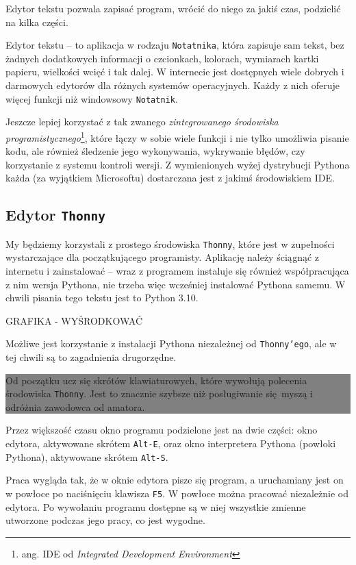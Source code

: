 \documentclass[a4paper]{article}
\newcommand{\important}[1]{
    \begin{center}\colorbox{gray}{
        \begin{minipage}[t]{0.9\textwidth}{#1}
        \end{minipage}
    }
    \end{center}
}
\begin{document}
Edytor tekstu pozwala zapisać program, wrócić do niego za jakiś czas, podzielić na kilka części.

Edytor tekstu -- to aplikacja w rodzaju \texttt{Notatnika}, która zapisuje sam tekst, bez żadnych dodatkowych informacji o czcionkach, kolorach, wymiarach kartki papieru, wielkości wcięć i tak dalej. W internecie jest dostępnych wiele dobrych i darmowych edytorów dla różnych systemów operacyjnych. Każdy z nich oferuje więcej funkcji niż windowsowy \texttt{Notatnik}.

Jeszcze lepiej korzystać z tak zwanego \emph{zintegrowanego środowiska programistycznego}\footnote{ang. IDE od \emph{Integrated Development Environment}}, które łączy w sobie wiele funkcji i nie tylko umożliwia pisanie kodu, ale również śledzenie jego wykonywania, wykrywanie błędów, czy korzystanie z systemu kontroli wersji. Z wymienionych wyżej dystrybucji Pythona każda (za wyjątkiem Microsoftu) dostarczana jest z jakimś środowiskiem IDE.


\subsection{Edytor \texttt{Thonny}}
My będziemy korzystali z prostego środowiska \texttt{Thonny}, które jest w zupełności wystarczające dla początkującego programisty. Aplikację  należy ściągnąć z internetu i zainstalować -- wraz z programem instaluje się również współpracująca z nim wersja Pythona, nie trzeba więc wcześniej instalować Pythona samemu. W chwili pisania tego tekstu jest to Python 3.10.

GRAFIKA - WYŚRODKOWAĆ %

Możliwe jest korzystanie z instalacji Pythona niezależnej od \texttt{Thonny'ego}, ale w tej chwili są to zagadnienia drugorzędne.

\important{Od początku ucz się skrótów klawiaturowych, które wywołują polecenia środowiska \texttt{Thonny}. Jest to znacznie szybsze niż posługiwanie się myszą i odróżnia zawodowca od amatora.}

Przez większość czasu okno programu podzielone jest na dwie części: okno edytora, aktywowane skrótem \texttt{Alt-E}, oraz okno interpretera Pythona (powłoki Pythona), aktywowane skrótem \texttt{Alt-S}.

Praca wygląda tak, że w oknie edytora pisze się program, a uruchamiany jest on w powłoce po naciśnięciu klawisza \texttt{F5}. W powłoce można pracować niezależnie od edytora. Po wywołaniu programu dostępne są w niej wszystkie zmienne utworzone podczas jego pracy, co jest wygodne.
\end{document}

